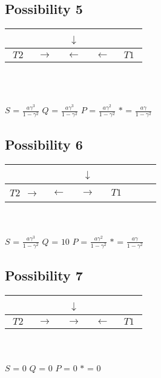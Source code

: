 \documentclass{article}
\begin{document}
\subsection{Possibility 5}

\begin{tabular}{|c|c|c|c|c|}
\hline 
~~~ & ~~~ & ~$\downarrow$~ & ~~~ & ~~~\tabularnewline
\hline 
\hline 
$T2$ & $\begin{array}{c}
\rightarrow\end{array}$ & $\leftarrow$ & $\leftarrow$ & $T1$\tabularnewline
\hline 
\end{tabular}\\
\\
\space\space	

$S$ = $\frac{a\gamma^{3}}{1-\gamma^{2}}$
\space\space $Q$ = $\frac{a\gamma^{3}}{1-\gamma^{2}}$
\space\space$P$ = $\frac{a\gamma^{2}}{1-\gamma^{2}}$
\space\space$*$ = $\frac{a\gamma}{1-\gamma^{2}}$\space\space

\subsection{Possibility 6}

\begin{tabular}{|c|c|c|c|c|}
\hline 
~~~ & ~~~ & ~$\downarrow$~ & ~~~ & ~~~\tabularnewline
\hline 
\hline 
$T2$  $\begin{array}{c}
\rightarrow\end{array}$ & $\leftarrow$ & $\rightarrow$ & $T1$\tabularnewline
\hline 
\end{tabular}\\
\\
\space\space
$S$ = $\frac{a\gamma^{3}}{1-\gamma^{2}}$
\space\space$Q$ = $10$
\space\space$P$ = $\frac{a\gamma^{2}}{1-\gamma^{2}}$
\space\space$*$ = $\frac{a\gamma}{1-\gamma^{2}}$\space\space
 

\subsection{Possibility 7}

\begin{tabular}{|c|c|c|c|c|}
\hline 
~~~ & ~~~ & ~$\downarrow$~ & ~~~ & ~~~\tabularnewline
\hline 
\hline 
$T2$ & $\begin{array}{c}
\rightarrow\end{array}$ & $\rightarrow$ & $\leftarrow$ & $T1$\tabularnewline
\hline 
\end{tabular}\\
\\
\space\space
$S$ = $0$
\space\space 
$Q$ = $0$
\space\space
 $P$ = $0$
\space\space
 $*$ = $0$
\space\space
 
\end{document}
